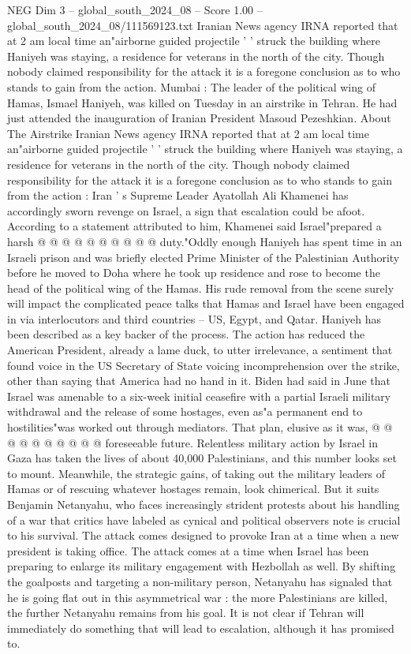 \begin{textsample}{NEG Dim 3 – global\_south\_2024\_08 – Score 1.00 – global\_south\_2024\_08/111569123.txt}  \label{ex:f3_neg_124}
Iranian News agency IRNA reported that at 2 am local time an"airborne guided projectile ' ' struck the building where Haniyeh was staying, a residence for veterans in the north of the city.
Though nobody claimed responsibility for the attack it is a foregone conclusion as to who stands to gain from the action.
Mumbai : The leader of the political wing of Hamas, Ismael Haniyeh, was killed on Tuesday in an airstrike in Tehran.
He had just attended the inauguration of Iranian President Masoud Pezeshkian.
About The Airstrike Iranian News agency IRNA reported that at 2 am local time an"airborne guided projectile ' ' struck the building where Haniyeh was staying, a residence for veterans in the north of the city.
Though nobody claimed responsibility for the attack it is a foregone conclusion as to who stands to gain from the action : Iran ' s Supreme Leader Ayatollah Ali Khamenei has accordingly sworn revenge on Israel, a sign that escalation could be afoot.
According to a statement attributed to him, Khamenei said Israel"prepared a harsh @ @ @ @ @ @ @ @ @ @ duty."Oddly enough Haniyeh has spent time in an Israeli prison and was briefly elected Prime Minister of the Palestinian Authority before he moved to Doha where he took up residence and rose to become the head of the political wing of the Hamas.
His rude removal from the scene surely will impact the complicated peace talks that Hamas and Israel have been engaged in via interlocutors and third countries -- US, Egypt, and Qatar.
Haniyeh has been described as a key backer of the process.
The action has reduced the American President, already a lame duck, to utter irrelevance, a sentiment that found voice in the US Secretary of State voicing incomprehension over the strike, other than saying that America had no hand in it.
Biden had said in June that Israel was amenable to a six-week initial ceasefire with a partial Israeli military withdrawal and the release of some hostages, even as"a permanent end to hostilities"was worked out through mediators.
That plan, elusive as it was, @ @ @ @ @ @ @ @ @ @ foreseeable future.
Relentless military action by Israel in Gaza has taken the lives of about 40,000 Palestinians, and this number looks set to mount.
Meanwhile, the strategic gains, of taking out the military leaders of Hamas or of rescuing whatever hostages remain, look chimerical.
But it suits Benjamin Netanyahu, who faces increasingly strident protests about his handling of a war that critics have labeled as cynical and political observers note is crucial to his survival.
The attack comes designed to provoke Iran at a time when a new president is taking office.
The attack comes at a time when Israel has been preparing to enlarge its military engagement with Hezbollah as well.
By shifting the goalposts and targeting a non-military person, Netanyahu has signaled that he is going flat out in this asymmetrical war : the more Palestinians are killed, the further Netanyahu remains from his goal.
It is not clear if Tehran will immediately do something that will lead to escalation, although it has promised to.

\end{textsample}

